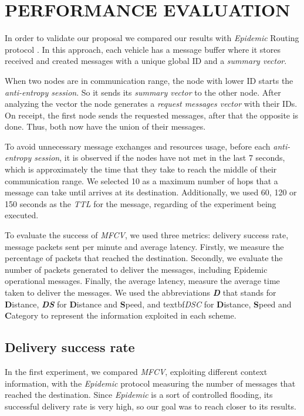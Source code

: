 \documentclass[letterpaper, 10 pt, conference]{ieeeconf}  %
\begin{document}
\section{PERFORMANCE EVALUATION}

In order to validate our proposal we compared our results with \emph{Epidemic} Routing protocol \cite{Vahdat-2000}. In this approach, each vehicle has a message buffer where it stores received and created messages with a unique global ID and a \emph{summary vector}.

When two nodes are in communication range, the node with lower ID starts the \emph{anti-entropy session}. So it sends its \emph{summary vector} to the other node. After analyzing the vector the node generates a \emph{request messages vector} with their IDs. On receipt, the first node sends the requested messages, after that the opposite is done. Thus, both now have the union of their messages.

To avoid unnecessary message exchanges and resources usage, before each \emph{anti-entropy session}, it is observed if the nodes have not met in the last 7 seconds, which is approximately the time that they take to reach the middle of their communication range. We selected 10 as a maximum number of hops that a message can take until arrives at its destination. Additionally, we used 60, 120 or 150 seconds as the \emph{TTL} for the message, regarding of the experiment being executed.

To evaluate the success of \emph{MFCV}, we used three metrics: delivery success rate, message packets sent per minute and average latency. Firstly, we measure the percentage of packets that reached the destination. Secondly, we evaluate the number of packets generated to deliver the messages, including Epidemic operational messages. Finally, the average latency, measure the average time taken to deliver the messages. We used the abbreviations \textbf{\emph{D}} that stands for \textbf{D}istance, \textbf{\emph{DS}} for \textbf{D}istance and \textbf{S}peed, and textbf{\emph{DSC}} for \textbf{D}istance, \textbf{S}peed and \textbf{C}ategory to represent the information exploited in each scheme.

\subsection{Delivery success rate}

In the first experiment, we compared \emph{MFCV}, exploiting different context information, with the \emph{Epidemic} protocol measuring the number of messages that reached the destination. Since \emph{Epidemic} is a sort of controlled flooding, its successful delivery rate is very high, so our goal was to reach closer to its results.
\end{document}
